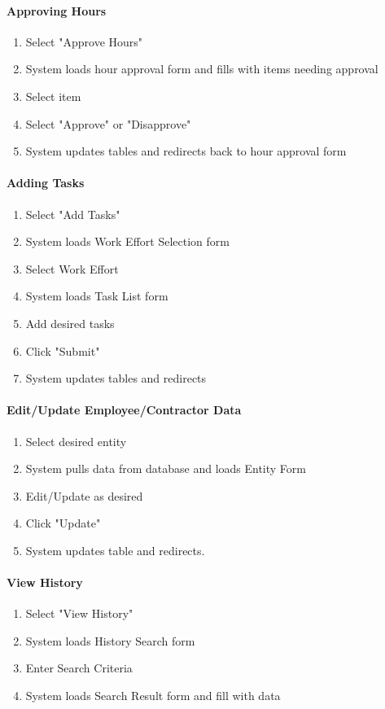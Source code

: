 \documentclass[letterpaper]{article}
\begin{document}
\paragraph{Approving Hours}
\begin{enumerate}
\item Select "Approve Hours"
\item System loads hour approval form and fills with items needing approval
\item Select item
\item Select "Approve" or "Disapprove"
\item System updates tables and redirects back to hour approval form
\end{enumerate}

\paragraph{Adding Tasks}
\begin{enumerate}
\item Select "Add Tasks"
\item System loads Work Effort Selection form
\item Select Work Effort
\item System loads Task List form
\item Add desired tasks
\item Click "Submit"
\item System updates tables and redirects
\end{enumerate}

\paragraph{Edit/Update Employee/Contractor Data}
\begin{enumerate}
\item Select desired entity
\item System pulls data from database and loads Entity Form
\item Edit/Update as desired
\item Click "Update"
\item System updates table and redirects.
\end{enumerate}

\paragraph{View History}
\begin{enumerate}
\item Select "View History"
\item System loads History Search form
\item Enter Search Criteria
\item System loads Search Result form and fill with data
\end{enumerate}
\end{document}
